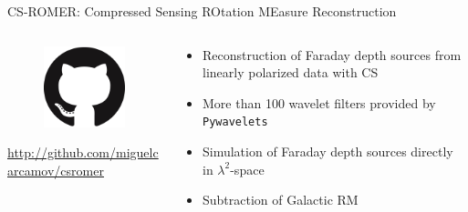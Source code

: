 \documentclass[xetex,aspectratio=169]{beamer}
\begin{document}
    \begin{frame}{CS-ROMER: Compressed Sensing ROtation MEasure Reconstruction}
        \begin{columns}[onlytextwidth,t]
        \begin{column}{.5\textwidth}
            \begin{figure}
                \centering
                \includegraphics[scale=0.5]{figures/logos/GitHub-Mark-120px-plus.png}
            \end{figure}
            
            \url{http://github.com/miguelcarcamov/csromer}
        \end{column}
    \begin{column}{.5\textwidth}
        \begin{itemize}
            \item Reconstruction of Faraday depth sources from linearly polarized data with CS
            \item More than 100 wavelet filters provided by {\tt Pywavelets}
            \item Simulation of Faraday depth sources directly in $\lambda^2$-space
            \item Subtraction of Galactic RM

        \end{itemize}
    \end{column}%
    
    \end{columns}
    \end{frame}
    
\end{document}
